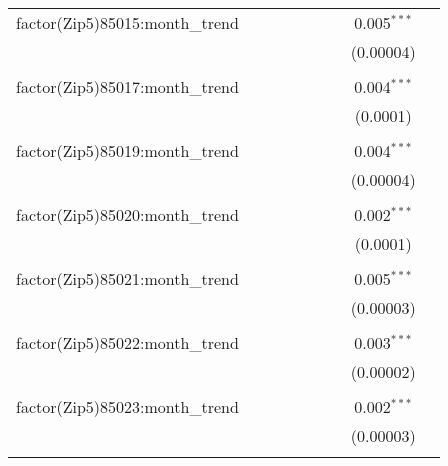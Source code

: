 \begin{table}[H]
{\begin{tabular}{@{\extracolsep{5pt}}lcccccccc}
  factor(Zip5)85015:month\_trend &  &  &  &  &  &  & 0.005$^{***}$ &  \\  

   &  &  &  &  &  &  & (0.00004) &  \\  

   & & & & & & & & \\  

  factor(Zip5)85017:month\_trend &  &  &  &  &  &  & 0.004$^{***}$ &  \\  

   &  &  &  &  &  &  & (0.0001) &  \\  

   & & & & & & & & \\  

  factor(Zip5)85019:month\_trend &  &  &  &  &  &  & 0.004$^{***}$ &  \\  

   &  &  &  &  &  &  & (0.00004) &  \\  

   & & & & & & & & \\  

  factor(Zip5)85020:month\_trend &  &  &  &  &  &  & 0.002$^{***}$ &  \\  

   &  &  &  &  &  &  & (0.0001) &  \\  

   & & & & & & & & \\  

  factor(Zip5)85021:month\_trend &  &  &  &  &  &  & 0.005$^{***}$ &  \\  

   &  &  &  &  &  &  & (0.00003) &  \\  

   & & & & & & & & \\  

  factor(Zip5)85022:month\_trend &  &  &  &  &  &  & 0.003$^{***}$ &  \\  

   &  &  &  &  &  &  & (0.00002) &  \\  

   & & & & & & & & \\  

  factor(Zip5)85023:month\_trend &  &  &  &  &  &  & 0.002$^{***}$ &  \\  

   &  &  &  &  &  &  & (0.00003) &  \\  

   & & & & & & & & \\  


\end{tabular}}
\end{table}
